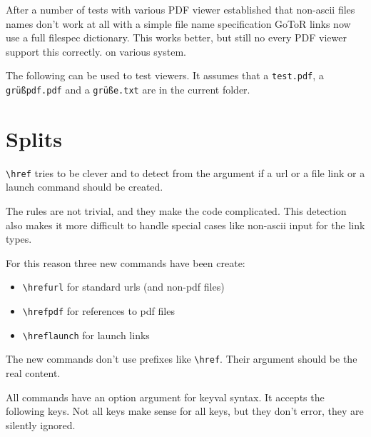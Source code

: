 \documentclass{article}
\newcommand\cs[1]{\texttt{\textbackslash #1}}
\begin{document}
After a number of tests with various PDF viewer established that non-ascii files names don't
work at all with a simple file name specification GoToR links now use a full
filespec dictionary. This works better, but still no every PDF viewer support this correctly. 
on various system. 

The following can be used to test viewers. It assumes that a \texttt{test.pdf},
a \texttt{grüßpdf.pdf} and a \texttt{grüße.txt} are in the current folder. 





\section{Splits}

\cs{href} tries to be clever and to detect from the argument
if a url or a file link or a launch command should be created. 

The rules are not trivial, and they make the code complicated.
This detection also makes it more difficult to handle special cases
like non-ascii input for the link types. 

For this reason three new commands have been create:

\begin{itemize}
\item \cs{hrefurl} for standard urls (and non-pdf files)
\item \cs{hrefpdf} for references to pdf files
\item \cs{hreflaunch} for launch links
\end{itemize}

The new commands don't use prefixes like \cs{href}. 
Their argument should be the real content.

All commands have an option argument for keyval syntax. 
It accepts the following keys. Not all keys make sense for all keys, but they don't
error, they are silently ignored. 
\end{document}

